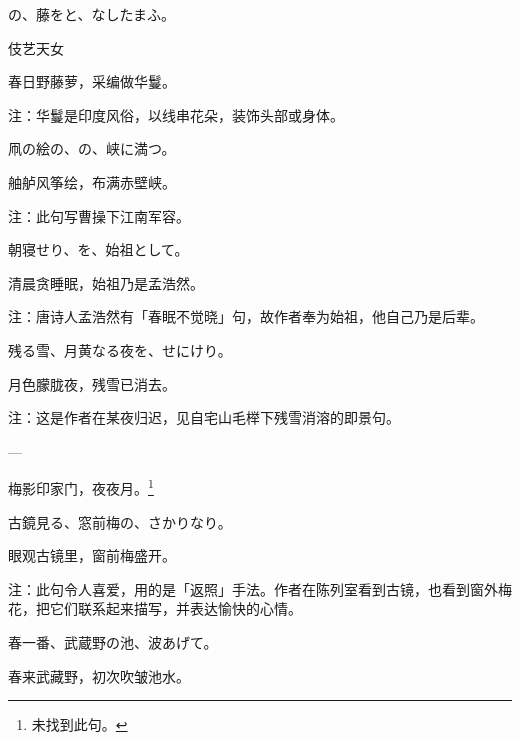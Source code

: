 \begin{haiku}
    {\FH {}の、藤をと、なしたまふ。}

    {\FK 伎艺天女}

    {\FK 春日野藤萝，采编做华鬘。}

    {\FT 注：华鬘是印度风俗，以线串花朵，装饰头部或身体。}
\end{haiku}

\begin{haiku}
    {\FH 凧の絵の、の、峡に満つ。}

    {\FK 舳舻风筝绘，布满赤壁峡。}

    {\FT 注：此句写曹操下江南军容。}
\end{haiku}

\begin{haiku}
    {\FH 朝寝せり、を、始祖として。}

    {\FK 清晨贪睡眠，始祖乃是孟浩然。}

    {\FT 注：唐诗人孟浩然有「春眠不觉晓」句，故作者奉为始祖，他自己乃是后辈。}
\end{haiku}

\begin{haiku}
    {\FH 残る雪、月黄なる夜を、せにけり。}

    {\FK 月色朦胧夜，残雪已消去。}

    {\FT 注：这是作者在某夜归迟，见自宅山毛榉下残雪消溶的即景句。}
\end{haiku}

\begin{haiku}
    {\FH ---}

    {\FK 梅影印家门，夜夜月。\footnote{\FT 未找到此句。}}
\end{haiku}

\begin{haiku}
    {\FH 古鏡見る、窓前梅の、さかりなり。}

    {\FK 眼观古镜里，窗前梅盛开。}

    {\FT 注：此句令人喜爱，用的是「返照」手法。作者在陈列室看到古镜，也看到窗外梅花，把它们联系起来描写，并表达愉快的心情。}
\end{haiku}

\begin{haiku}
    {\FH 春一番、武蔵野の池、波あげて。}

    {\FK 春来武藏野，初次吹皱池水。}
\end{haiku}

